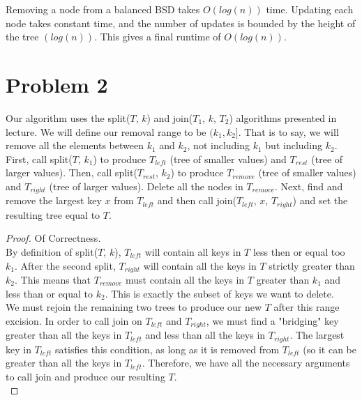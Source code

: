 \documentclass{article}
\theoremstyle{casestyle}
\begin{document}
Removing a node from a balanced BSD takes $O(log(n))$ time. Updating each node takes constant time, and the number of updates is bounded by the height of the tree $(log(n))$. This gives a final runtime of $O(log(n))$.\\

\newpage

\section *{Problem 2}
Our algorithm uses the split($T$, $k$) and join($T_1$, $k$, $T_2$) algorithms presented in lecture. We will define our removal range to be $(k_1, k_2]$. That is to say, we will remove all the elements between $k_1$ and $k_2$, not including $k_1$ but including $k_2$.\\

First, call split($T$, $k_1$) to produce $T_{left}$ (tree of smaller values) and $T_{rest}$ (tree of larger values). Then, call split($T_{rest}$, $k_2$) to produce $T_{remove}$ (tree of smaller values) and $T_{right}$ (tree of larger values). Delete all the nodes in $T_{remove}$. Next, find and remove the largest key $x$ from $T_{left}$ and then call join($T_{left}$, $x$, $T_{right}$) and set the resulting tree equal to $T$. \\

\begin{proof} Of Correctness.\\
  By definition of split($T$, $k$), $T_{left}$ will contain all keys in $T$ less then or equal too $k_1$. After the second split, $T_{right}$ will contain all the keys in $T$ strictly greater than $k_2$. This means that $T_{remove}$ must contain all the keys in $T$ greater than $k_1$ and less than or equal to $k_2$. This is exactly the subset of keys we want to delete.\\

  We must rejoin the remaining two trees to produce our new $T$ after this range excision. In order to call join on $T_{left}$ and $T_{right}$, we must find a "bridging" key greater than all the keys in $T_{left}$ and less than all the keys in $T_{right}$. The largest key in $T_{left}$ satisfies this condition, as long as it is removed from $T_{left}$ (so it can be greater than all the keys in $T_{left}$. Therefore, we have all the necessary arguments to call join and produce our resulting $T$.\\

\end{proof}
\end{document}
